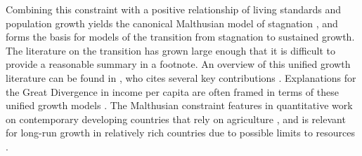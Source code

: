 Combining this constraint with a positive relationship of living standards and population growth yields the canonical Malthusian model of stagnation \citep{ashraf2010dynamics}, and forms the basis for models of the transition from stagnation to sustained growth. The literature on the transition has grown large enough that it is difficult to provide a reasonable summary in a footnote. An overview of this unified growth literature can be found in \citet{Galor:2011uq}, who cites several key contributions \citep{gw00,galor2002natural,Hansen:2002fk,doepke2004accounting,cs2005,lagerlof2006,craftsmills2009,strulik2008population}. Explanations for the Great Divergence in income per capita are often framed in terms of these unified growth models \citep{kp2001,galor2008trading,vollrath2011,vv08,vv13,cs2015}. The Malthusian constraint features in quantitative work on contemporary developing countries that rely on agriculture \citep{Gollin:2007oq,Restuccia:2008hc,weilwilde2009,Gollin:2010ys,ev2016clim}, and is relevant for long-run growth in relatively rich countries due to possible limits to resources \citep{perettovalente2015}.